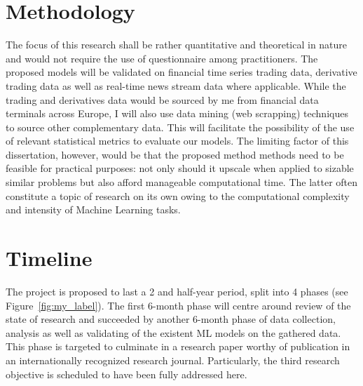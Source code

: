 \documentclass[a4paper,11pt]{scrartcl}
\newcommand{\reffig}[1]{Figure~\ref{#1}}
\begin{document}
%
\section{Methodology}
The focus of this research shall be rather quantitative and theoretical in nature and would not require the use of questionnaire among practitioners.  The proposed models will be validated on financial time series trading data, derivative trading data as well as real-time news stream data where applicable. While the trading and derivatives data would be sourced by me from financial data terminals across Europe, I will also use data mining (web scrapping) techniques to source other complementary data. This will facilitate the possibility of the use of relevant statistical metrics to evaluate our models. The limiting factor of this dissertation, however, would be that the proposed method methods need to be feasible for practical purposes: not only should it upscale when applied to sizable similar problems but also afford manageable computational time. The latter often constitute a topic of research on its own owing to the computational complexity and intensity of Machine Learning tasks.

%
\section{Timeline}
The project is proposed to last a 2 and half-year period, split into 4 phases (see \reffig{fig:my_label}). The first 6-month phase will centre around review of the state of research and succeeded by another 6-month phase of data collection, analysis as well as validating of the existent ML models on the gathered data. This phase is targeted to culminate in a research paper worthy of publication in an internationally recognized research journal. Particularly, the third research objective is scheduled to have been fully addressed here.
\end{document}
